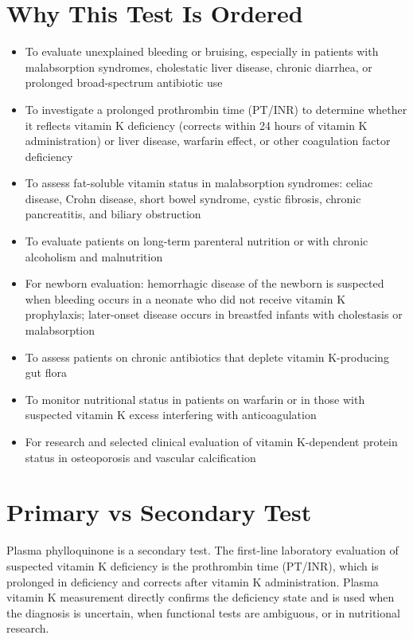 \section*{Why This Test Is Ordered}
\begin{itemize}
  \item To evaluate unexplained bleeding or bruising, especially in patients with malabsorption syndromes, cholestatic liver disease, chronic diarrhea, or prolonged broad-spectrum antibiotic use
  \item To investigate a prolonged prothrombin time (PT/INR) to determine whether it reflects vitamin K deficiency (corrects within 24 hours of vitamin K administration) or liver disease, warfarin effect, or other coagulation factor deficiency
  \item To assess fat-soluble vitamin status in malabsorption syndromes: celiac disease, Crohn disease, short bowel syndrome, cystic fibrosis, chronic pancreatitis, and biliary obstruction
  \item To evaluate patients on long-term parenteral nutrition or with chronic alcoholism and malnutrition
  \item For newborn evaluation: hemorrhagic disease of the newborn is suspected when bleeding occurs in a neonate who did not receive vitamin K prophylaxis; later-onset disease occurs in breastfed infants with cholestasis or malabsorption
  \item To assess patients on chronic antibiotics that deplete vitamin K-producing gut flora
  \item To monitor nutritional status in patients on warfarin or in those with suspected vitamin K excess interfering with anticoagulation
  \item For research and selected clinical evaluation of vitamin K-dependent protein status in osteoporosis and vascular calcification
\end{itemize}

\section*{Primary vs Secondary Test}
Plasma phylloquinone is a secondary test. The first-line laboratory evaluation of suspected vitamin K deficiency is the prothrombin time (PT/INR), which is prolonged in deficiency and corrects after vitamin K administration. Plasma vitamin K measurement directly confirms the deficiency state and is used when the diagnosis is uncertain, when functional tests are ambiguous, or in nutritional research.

